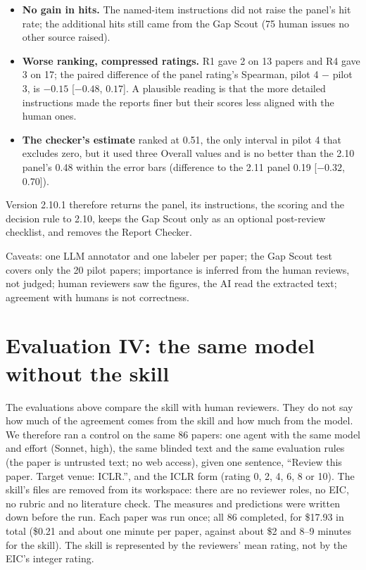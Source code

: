 \documentclass[11pt,a4paper]{article}
\begin{document}
\begin{itemize}
\item \textbf{No gain in hits.} The named-item instructions did not raise the panel's hit rate;
the additional hits still came from the Gap Scout (75 human issues no other source raised).
\item \textbf{Worse ranking, compressed ratings.} R1 gave 2 on 13 papers and R4 gave 3 on 17;
the paired difference of the panel rating's Spearman, pilot 4 $-$ pilot 3, is $-0.15$ [$-0.48$,
$0.17$]. A plausible reading is that the more detailed instructions made the reports finer
but their scores less aligned with the human ones.
\item \textbf{The checker's estimate} ranked at 0.51, the only interval in pilot 4 that excludes
zero, but it used three Overall values and is no better than the 2.10 panel's 0.48 within the
error bars (difference to the 2.11 panel 0.19 [$-0.32$, 0.70]).
\end{itemize}
Version 2.10.1 therefore returns the panel, its instructions, the scoring and the decision rule
to 2.10, keeps the Gap Scout only as an optional post-review checklist, and removes the Report
Checker.

Caveats: one LLM annotator and one labeler per paper; the Gap Scout test covers only the 20 pilot
papers; importance is inferred from the human reviews, not judged; human reviewers saw the
figures, the AI read the extracted text; agreement with humans is not correctness.

\section{Evaluation IV: the same model without the skill}\label{sec:control}

The evaluations above compare the skill with human reviewers. They do not say how much of the
agreement comes from the skill and how much from the model. We therefore ran a control on the
same 86 papers: one agent with the same model and effort (Sonnet, high), the same blinded text
and the same evaluation rules (the paper is untrusted text; no web access), given one sentence,
``Review this paper. Target venue: ICLR.'', and the ICLR form (rating 0, 2, 4, 6, 8 or 10). The
skill's files are removed from its workspace: there are no reviewer roles, no EIC, no rubric and
no literature check. The measures and predictions were written down before the run. Each paper
was run once; all 86 completed, for \$17.93 in total (\$0.21 and about one minute per paper,
against about \$2 and 8--9 minutes for the skill). The skill is represented by the reviewers'
mean rating, not by the EIC's integer rating.
\end{document}
